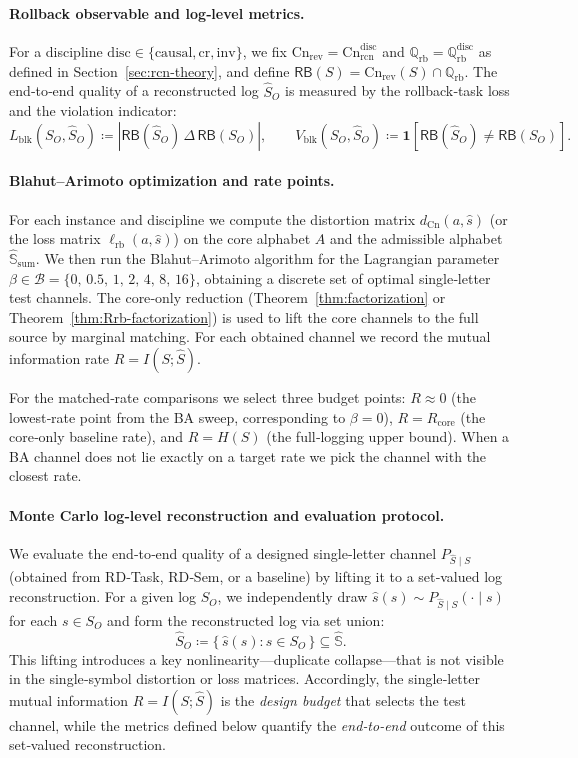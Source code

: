 \documentclass[twoside]{article}
\newcommand{\Cn}{\mathrm{Cn}}
\newcommand{\1}{\mathbf{1}}
\begin{document}
\paragraph{Rollback observable and log‑level metrics.}
For a discipline \(\mathrm{disc}\in\{\mathrm{causal},\mathrm{cr},\mathrm{inv}\}\),
we fix \(\Cn_{\mathrm{rev}}=\Cn^{\mathrm{disc}}_{\mathrm{rcn}}\) and
\(\mathbb Q_{\mathrm{rb}}=\mathbb Q^{\mathrm{disc}}_{\mathrm{rb}}\) as defined in
Section~\ref{sec:rcn-theory}, and define \(\mathsf{RB}(S)=\Cn_{\mathrm{rev}}(S)\cap\mathbb Q_{\mathrm{rb}}\).
The end‑to‑end quality of a reconstructed log \(\hat S_O\) is measured by the
rollback‑task loss and the violation indicator:
\[
L_{\mathrm{blk}}(S_O,\hat S_O) \coloneqq |\mathsf{RB}(\hat S_O)\,\Delta\,\mathsf{RB}(S_O)|,
\qquad
V_{\mathrm{blk}}(S_O,\hat S_O) \coloneqq \mathbf 1[\mathsf{RB}(\hat S_O)\neq\mathsf{RB}(S_O)].
\]

\paragraph{Blahut–Arimoto optimization and rate points.}
For each instance and discipline we compute the distortion matrix
\(d_{\Cn}(a,\hat s)\) (or the loss matrix \(\ell_{\mathrm{rb}}(a,\hat s)\)) on the
core alphabet \(A\) and the admissible alphabet \(\hat{\mathbb S}_{\mathrm{sum}}\).
We then run the Blahut–Arimoto algorithm for the Lagrangian parameter
\(\beta \in \mathcal B = \{0,\,0.5,\,1,\,2,\,4,\,8,\,16\}\), obtaining a discrete set
of optimal single‑letter test channels.
The core‑only reduction (Theorem~\ref{thm:factorization} or
Theorem~\ref{thm:Rrb-factorization}) is used to lift the core channels to the full
source by marginal matching.
For each obtained channel we record the mutual information rate
\(R = I(S;\hat S)\).

For the matched‑rate comparisons we select three budget points:
\(R \approx 0\) (the lowest‑rate point from the BA sweep, corresponding to
\(\beta=0\)), \(R = R_{\mathrm{core}}\) (the core‑only baseline rate), and
\(R = H(S)\) (the full‑logging upper bound).  When a BA channel does not lie exactly
on a target rate we pick the channel with the closest rate.

\paragraph{Monte Carlo log‑level reconstruction and evaluation protocol.}
We evaluate the end‑to‑end quality of a designed single‑letter channel
\(P_{\hat S\mid S}\) (obtained from RD‑Task, RD‑Sem, or a baseline) by
lifting it to a set‑valued log reconstruction.
For a given log \(S_O\), we independently draw
\(\hat s(s)\sim P_{\hat S\mid S}(\cdot\mid s)\) for each \(s\in S_O\) and
form the reconstructed log via set union:
\[
\hat S_O \coloneqq \{\,\hat s(s): s\in S_O\,\}\subseteq\hat{\mathbb S}.
\]
This lifting introduces a key nonlinearity—duplicate collapse—that is not
visible in the single‑symbol distortion or loss matrices.
Accordingly, the single‑letter mutual information
\(R=I(S;\hat S)\) is the \emph{design budget} that selects the test channel,
while the metrics defined below quantify the \emph{end‑to‑end} outcome of
this set‑valued reconstruction.
\end{document}
